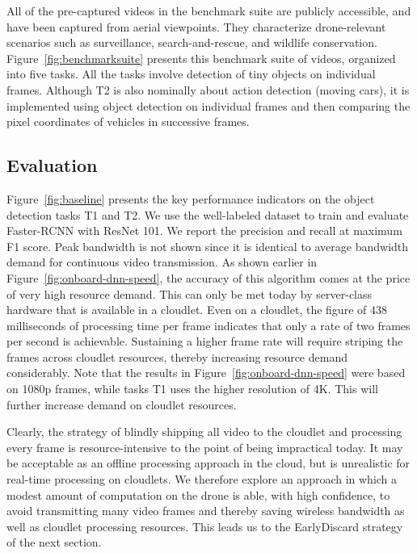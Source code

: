 All of the pre-captured videos in the benchmark suite are publicly accessible,
and have been captured from aerial viewpoints. They characterize drone-relevant
scenarios such as surveillance, search-and-rescue, and wildlife conservation.
Figure~\ref{fig:benchmarksuite} presents this benchmark suite of videos,
organized into five tasks. All the tasks involve detection of tiny objects on
individual frames. Although T2 is also nominally about action detection (moving
cars), it is implemented using object detection on individual frames and then
comparing the pixel coordinates of vehicles in successive frames.

\subsection{Evaluation}
\label{sec:dumbdrone-results}

Figure~\ref{fig:baseline} presents the key performance indicators on the object
detection tasks T1 and T2. We use the well-labeled dataset to train and evaluate
Faster-RCNN with ResNet 101. We report the precision and recall at maximum F1
score.  Peak bandwidth is not shown since it is identical to average bandwidth
demand for continuous video transmission.  As shown earlier in
Figure~\ref{fig:onboard-dnn-speed}, the accuracy of this algorithm comes at the
price of very high resource demand.  This can only be met today by server-class
hardware that is available in a cloudlet.  Even on a cloudlet, the figure of 438
milliseconds of processing time per frame indicates that only a rate of two
frames per second is achievable.  Sustaining a higher frame rate will require
striping the frames across cloudlet resources, thereby increasing resource
demand considerably.  Note that the results in
Figure~\ref{fig:onboard-dnn-speed} were based on 1080p frames, while tasks T1
uses the higher resolution of 4K. This will further increase demand on cloudlet
resources.

Clearly, the strategy of blindly shipping all video to the cloudlet
and processing every frame is resource-intensive to the point of being
impractical today.  It may be acceptable as an offline processing
approach in the cloud, but is unrealistic for real-time processing on
cloudlets.  We therefore explore an approach in which a modest amount
of computation on the drone is able, with high confidence, to avoid
transmitting many video frames and thereby saving wireless bandwidth
as well as cloudlet processing resources.  This leads us to the {\xc
  EarlyDiscard} strategy of the next section.




